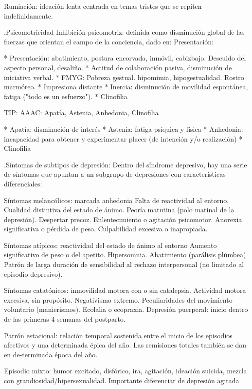 Rumiación: ideación lenta centrada en temas tristes que se repiten indefinidamente.

.Psicomotricidad
Inhibición psicomotriz: definida como disminución global de las fuerzas que orientan el campo de la conciencia, dado en: Presentación:

* Presentación: abatimiento, postura encorvada, inmóvil, cabizbajo. Descuido del aspecto personal, desaliño.
* Actitud de colaboración pasiva, disminución de iniciativa verbal.
* FMYG: Pobreza gestual. hipomimia, hipogestualidad. Rostro marmóreo.
* Impresiona distante
* Inercia: disminución de movilidad espontánea, fatiga ("todo es un esfuerzo").
* Clinofilia

TIP: AAAC: Apatía, Astenia, Anhedonia, Clinofilia

* Apatía: disminución de interés
* Astenia: fatiga psíquica y física
* Anhedonia: incapacidad para obtener y experimentar placer (de intención y/o realización)
* Clinofilia

.Síntomas de subtipos de depresión:
Dentro del síndrome depresivo, hay una serie de síntomas que apuntan a un subgrupo de depresiones con características diferenciales:

Síntomas melancólicos: marcada anhedonia Falta de reactividad al entorno. Cualidad distintiva del estado de ánimo. Peoría matutina (polo matinal de la depresión). Despertar precoz. Enlentecimiento o agitación psicomotor. Anorexia significativa o pérdida de peso. Culpabilidad excesiva o inapropiada.

Síntomas atípicos: reactividad del estado de ánimo al entorno Aumento significativo de peso o del apetito. Hipersomnia. Abatimiento (parálisis plúmbea) Patrón de larga duración de sensibilidad al rechazo interpersonal (no limitado al episodio depresivo).

Síntomas catatónicos: inmovilidad motora con o sin catalepsia. Actividad motora excesiva, sin propósito. Negativismo extremo. Peculiaridades del movimiento voluntario (manierismos). Ecolalia o ecopraxia. Depresión puerperal: inicio dentro de las primeras 4 semanas del postparto.

Patrón estacional: relación temporal sostenida entre el inicio de los episodios afectivos y una determinada épica del año. Las remisiones totales también se dan en de-terminada época del año.

Episodio mixto: humor excitado, disfórico, ira, agitación, ideación suicida, mezcla con grandiosidad/hipersexualidad. Importante diferenciar de depresión agitada.

